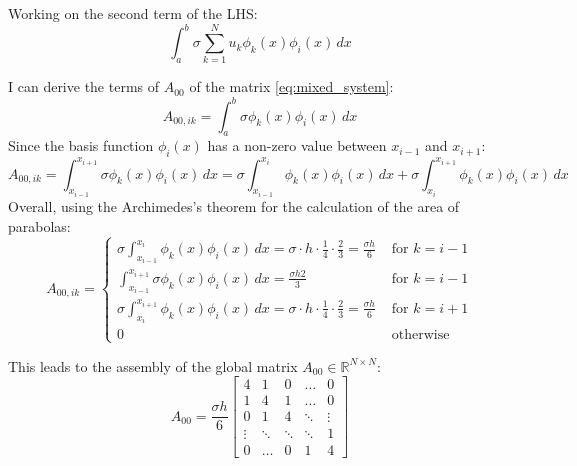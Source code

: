 \documentclass{article}
\begin{document}
Working on the second term of the LHS:
\begin{equation*}
    \int_a^b \sigma \sum_{k=1}^{N} u_k \phi_k(x) \phi_i(x) \, dx
\end{equation*}

I can derive the terms of $A_{00}$ of the matrix \eqref{eq:mixed_system}:
\begin{equation*}
    A_{00,ik} = \int_a^b \sigma \phi_k(x) \phi_i(x) \, dx
\end{equation*}
Since the basis function $\phi_i(x)$ has a non-zero value between $x_{i-1}$ and $x_{i+1}$:
 \begin{equation*}
     A_{00,ik} = \int_{x_{i-1}}^{x_{i+1}} \sigma \phi_k(x) \phi_i(x) \, dx = \sigma \int_{x_{i-1}}^{x_{i}}\phi_k(x) \phi_i(x) \, dx + \sigma \int_{x_{i}}^{x_{i+1 }}\phi_k(x) \phi_i(x) \, dx 
 \end{equation*}
 Overall, using the Archimedes's theorem for the calculation of the area of parabolas:
 \begin{equation*}
     A_{00,ik} =
     \begin{cases}
         \sigma \int_{x_{i-1}}^{x_{i}}\phi_k(x) \phi_i(x) \, dx = \sigma \cdot h\cdot \frac{1}{4} \cdot \frac{2}{3} = \frac{\sigma h}{6}&\text{  for } k = i-1 \\
         \int_{x_{i-1}}^{x_{i+1}} \sigma \phi_k(x) \phi_i(x) \, dx = \frac{\sigma h 2}{3}&\text{  for } k = i-1 \\
         \sigma \int_{x_{i}}^{x_{i+1 }}\phi_k(x) \phi_i(x) \, dx = \sigma \cdot h\cdot \frac{1}{4} \cdot \frac{2}{3} = \frac{\sigma h}{6} &\text{  for } k = i+1 \\
         0 &\text{  otherwise}
     \end{cases}
 \end{equation*}

 This leads to the assembly of the global matrix $A_{00} \in \mathbb{R}^{N \times N}$: 
\begin{equation*} \label{eq:matrix_A00}
    A_{00} = \frac{\sigma h}{6}
    \begin{bmatrix}
        4 & 1 & 0 & \dots & 0 \\
        1 & 4 & 1 & \dots & 0 \\
        0 & 1 & 4 & \ddots & \vdots \\
        \vdots & \ddots & \ddots & \ddots & 1 \\
        0 & \dots & 0 & 1 & 4
    \end{bmatrix}
\end{equation*}
\end{document}
